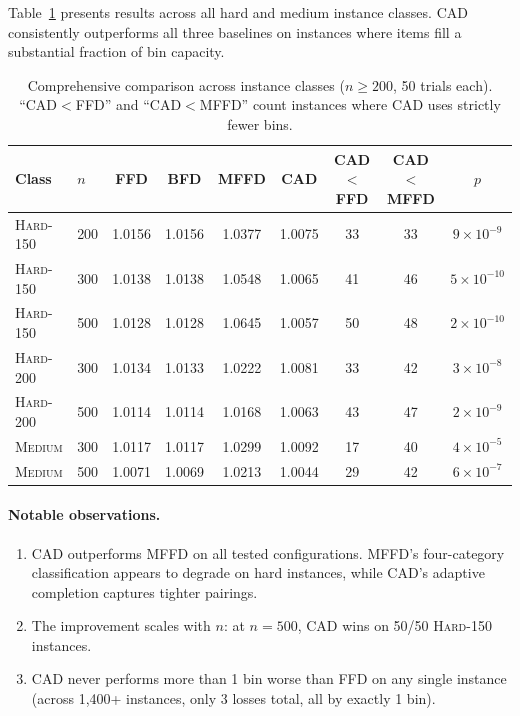 \documentclass[11pt]{article}
\begin{document}
Table~\ref{tab:comprehensive} presents results across all hard and medium instance classes.
CAD consistently outperforms all three baselines on instances where items fill a substantial
fraction of bin capacity.

\begin{table}[h]
\centering
\caption{Comprehensive comparison across instance classes ($n \geq 200$, 50 trials each).
  ``CAD$<$FFD'' and ``CAD$<$MFFD'' count instances where CAD uses strictly fewer bins.}
\label{tab:comprehensive}
\small
\begin{tabular}{llccccccc}
\toprule
\textbf{Class} & $n$ & FFD & BFD & MFFD & CAD & CAD$<$FFD & CAD$<$MFFD & $p$ \\
\midrule
\textsc{Hard-150} & 200 & 1.0156 & 1.0156 & 1.0377 & 1.0075 & 33 & 33 & $9 \times 10^{-9}$ \\
\textsc{Hard-150} & 300 & 1.0138 & 1.0138 & 1.0548 & 1.0065 & 41 & 46 & $5 \times 10^{-10}$ \\
\textsc{Hard-150} & 500 & 1.0128 & 1.0128 & 1.0645 & 1.0057 & 50 & 48 & $2 \times 10^{-10}$ \\
\textsc{Hard-200} & 300 & 1.0134 & 1.0133 & 1.0222 & 1.0081 & 33 & 42 & $3 \times 10^{-8}$ \\
\textsc{Hard-200} & 500 & 1.0114 & 1.0114 & 1.0168 & 1.0063 & 43 & 47 & $2 \times 10^{-9}$ \\
\textsc{Medium}   & 300 & 1.0117 & 1.0117 & 1.0299 & 1.0092 & 17 & 40 & $4 \times 10^{-5}$ \\
\textsc{Medium}   & 500 & 1.0071 & 1.0069 & 1.0213 & 1.0044 & 29 & 42 & $6 \times 10^{-7}$ \\
\bottomrule
\end{tabular}
\end{table}

\paragraph{Notable observations.}
\begin{enumerate}[nosep]
  \item CAD outperforms MFFD on all tested configurations. MFFD's four-category classification
        appears to degrade on hard instances, while CAD's adaptive completion captures tighter
        pairings.
  \item The improvement scales with $n$: at $n = 500$, CAD wins on 50/50 \textsc{Hard-150}
        instances.
  \item CAD never performs more than 1 bin worse than FFD on any single instance (across 1{,}400+
        instances, only 3 losses total, all by exactly 1 bin).
\end{enumerate}
\end{document}
